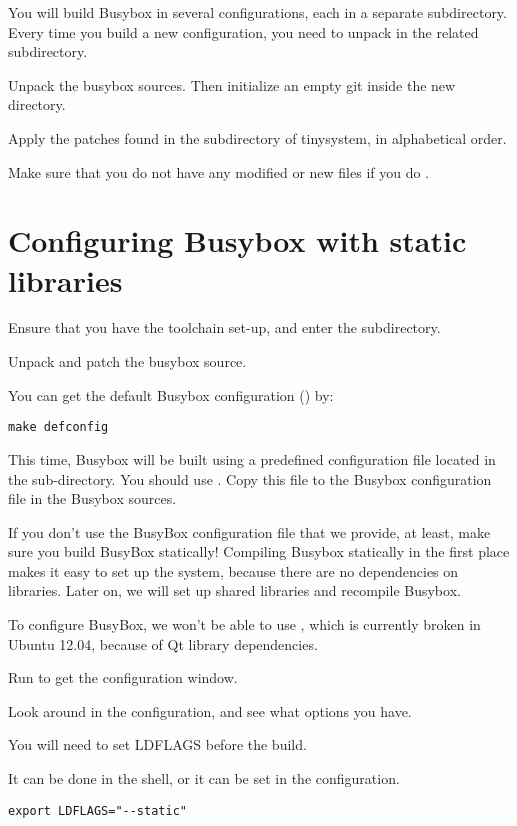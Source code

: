 You will build Busybox in several configurations, each in a separate subdirectory.
Every time you build a new configuration, you need to unpack in the related subdirectory.

Unpack the busybox sources. Then initialize an empty git inside the new directory.

Apply the patches found in the  subdirectory of {tinysystem}, in alphabetical order.

Make sure that you do not have any modified or new files if you do .

\section{Configuring Busybox with static libraries}

Ensure that you have the toolchain set-up, and enter the  subdirectory.

Unpack and patch the busybox source.

You can get the default Busybox configuration () by:

\begin{verbatim}
make defconfig
\end{verbatim}

This time, Busybox will be built using a predefined configuration file located in the 
 sub-directory. You should use .
Copy this file to the Busybox configuration file  in the Busybox sources.

If you don't use the BusyBox configuration file that we provide, at least,
make sure you build BusyBox statically! Compiling Busybox
statically in the first place makes it easy to set up the system,
because there are no dependencies on libraries. Later on, we will set
up shared libraries and recompile Busybox.

To configure BusyBox, we won't be able to use ,
which is currently broken in Ubuntu 12.04, because of Qt library
dependencies.

Run  to get the configuration window.

Look around in the configuration, and see what options you have.

You will need to set LDFLAGS before the build.

It can be done in the shell, or it can be set in the configuration.

\begin{verbatim}
export LDFLAGS="--static"
\end{verbatim}

